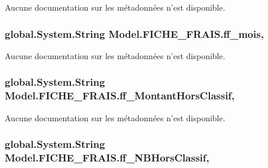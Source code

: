 Aucune documentation sur les métadonnées n'est disponible. 

\hypertarget{class_model_1_1_f_i_c_h_e___f_r_a_i_s_a5eb7f69b224a609736362ff9827a478c}{
\subsubsection[{ff\-\_\-mois}]{\setlength{\rightskip}{0pt plus 5cm}global.\-System.\-String Model.\-F\-I\-C\-H\-E\-\_\-\-F\-R\-A\-I\-S.\-ff\-\_\-mois\hspace{0.3cm}{\ttfamily [get]}, {\ttfamily [set]}}}\label{class_model_1_1_f_i_c_h_e___f_r_a_i_s_a5eb7f69b224a609736362ff9827a478c}


Aucune documentation sur les métadonnées n'est disponible. 

\hypertarget{class_model_1_1_f_i_c_h_e___f_r_a_i_s_af42dd6d52cf739434c1a9381c86f43f8}{
\subsubsection[{ff\-\_\-\-Montant\-Hors\-Classif}]{\setlength{\rightskip}{0pt plus 5cm}global.\-System.\-String Model.\-F\-I\-C\-H\-E\-\_\-\-F\-R\-A\-I\-S.\-ff\-\_\-\-Montant\-Hors\-Classif\hspace{0.3cm}{\ttfamily [get]}, {\ttfamily [set]}}}\label{class_model_1_1_f_i_c_h_e___f_r_a_i_s_af42dd6d52cf739434c1a9381c86f43f8}


Aucune documentation sur les métadonnées n'est disponible. 

\hypertarget{class_model_1_1_f_i_c_h_e___f_r_a_i_s_ad5391808a353591c1469fa57668079d0}{
\subsubsection[{ff\-\_\-\-N\-B\-Hors\-Classif}]{\setlength{\rightskip}{0pt plus 5cm}global.\-System.\-String Model.\-F\-I\-C\-H\-E\-\_\-\-F\-R\-A\-I\-S.\-ff\-\_\-\-N\-B\-Hors\-Classif\hspace{0.3cm}{\ttfamily [get]}, {\ttfamily [set]}}}\label{class_model_1_1_f_i_c_h_e___f_r_a_i_s_ad5391808a353591c1469fa57668079d0}


